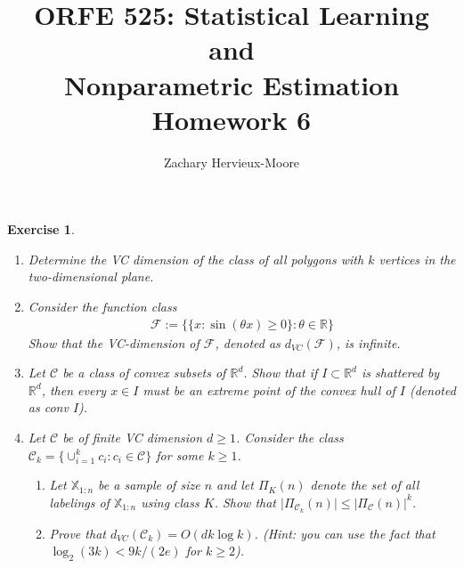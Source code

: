 \documentclass[12pt]{article}
\title{ORFE 525: Statistical Learning and \\ Nonparametric Estimation \\ Homework 6}
\author{Zachary Hervieux-Moore}
\date{\displaydate{date}}
\theoremstyle{colon}
\newtheorem{exercise}{Exercise}
\begin{document}
\maketitle

\clearpage

\begin{exercise}
  \leavevmode
  \begin{enumerate}[label=\arabic*)]
    \item Determine the VC dimension of the class of all polygons with $k$ vertices in the two-dimensional plane.
    \item Consider the function class
      \begin{gather*}
        \mathcal{F} := \{ \{x : \sin(\theta x) \geq 0 \} : \theta \in \mathbb{R} \}
      \end{gather*}
      Show that the VC-dimension of $\mathcal{F}$, denoted as $d_{VC}(\mathcal{F})$, is infinite.
    \item Let $\mathcal{C}$ be a class of convex subsets of $\mathbb{R}^d$. Show that if $I \subset \mathbb{R}^d$ is shattered by $\mathbb{R}^d$, then every $x \in I$ must be an extreme point of the convex hull of $I$ (denoted as conv $I$).
    \item Let $\mathcal{C}$ be of finite VC dimension $d \geq 1$. Consider the class $\mathcal{C}_k = \{\cup_{i=1}^k c_i : c_i \in \mathcal{C}\}$ for some $k \geq 1$.
      \begin{enumerate}[label=\alph*)]
        \item Let $\mathbb{X}_{1:n}$ be a sample of size $n$ and let $\Pi_K (n)$ denote the set of all labelings of $\mathbb{X}_{1:n}$ using class $K$. Show that $\lvert \Pi_{\mathcal{C}_k} (n) \rvert \leq \lvert \Pi_{\mathcal{C}} (n) \rvert^k$.
        \item Prove that $d_{VC}(\mathcal{C}_k) = O(dk \log k)$. (Hint: you can use the fact that $\log_2 (3k) < 9k/(2e)$ for $k \geq 2$).
      \end{enumerate}
  \end{enumerate}
\end{exercise}
\end{document}
